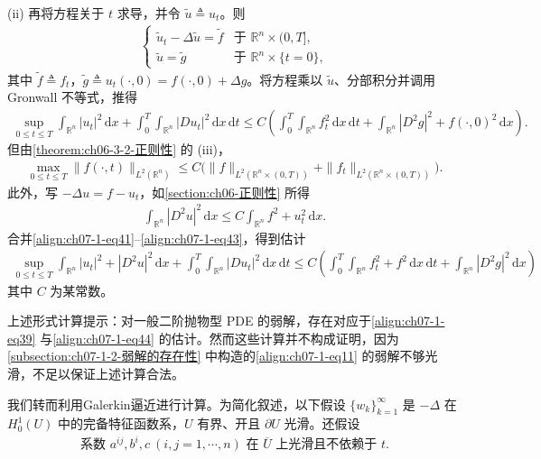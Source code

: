 \documentclass[../../main.tex]{subfiles}
\begin{document}
(ii) 再将方程关于 $t$ 求导，并令 $\widetilde{u}\triangleq u_t$。则
\begin{align}
\begin{cases}
\widetilde{u}_t-\Delta\widetilde{u}=\widetilde{f} & \text{于 } \mathbb{R}^n\times(0,T],\\
\widetilde{u}=\widetilde{g} & \text{于 } \mathbb{R}^n\times\{t=0\},
\end{cases}\label{align:ch07-1-eq40}
\end{align}
其中 $\widetilde{f}\triangleq f_t$，$\widetilde{g}\triangleq u_t(\cdot,0)=f(\cdot,0)+\Delta g$。将方程乘以 $\widetilde{u}$、分部积分并调用 Gronwall 不等式，推得
\begin{align}
\sup_{0\leqslant t\leqslant T}\int_{\mathbb{R}^n}|u_t|^2\,\mathrm{d}x + \int_0^T\int_{\mathbb{R}^n}|Du_t|^2\,\mathrm{d}x\,\mathrm{d}t
\leqslant C\left(\int_0^T\int_{\mathbb{R}^n} f_t^2\,\mathrm{d}x\,\mathrm{d}t + \int_{\mathbb{R}^n}|D^2g|^2+f(\cdot,0)^2\,\mathrm{d}x\right).\label{align:ch07-1-eq41}
\end{align}
但由\cref{theorem:ch06-3-2-正则性} 的 (iii)，
\begin{align}
\max_{0\leqslant t\leqslant T}\|f(\cdot,t)\|_{L^2(\mathbb{R}^n)} \leqslant C\bigl(\|f\|_{L^2(\mathbb{R}^n\times(0,T))}+\|f_t\|_{L^2(\mathbb{R}^n\times(0,T))}\bigr).\label{align:ch07-1-eq42}
\end{align}
此外，写 $-\Delta u=f-u_t$，如\cref{section:ch06-正则性} 所得
\begin{align}
\int_{\mathbb{R}^n}|D^2u|^2\,\mathrm{d}x \leqslant C\int_{\mathbb{R}^n} f^2+u_t^2\,\mathrm{d}x.\label{align:ch07-1-eq43}
\end{align}
合并\eqref{align:ch07-1-eq41}--\eqref{align:ch07-1-eq43}，得到估计
\begin{align}
\sup_{0\leqslant t\leqslant T}\int_{\mathbb{R}^n}|u_t|^2+|D^2u|^2\,\mathrm{d}x + \int_0^T\int_{\mathbb{R}^n}|Du_t|^2\,\mathrm{d}x\,\mathrm{d}t
\leqslant C\left(\int_0^T\int_{\mathbb{R}^n} f_t^2+f^2\,\mathrm{d}x\,\mathrm{d}t + \int_{\mathbb{R}^n}|D^2g|^2\,\mathrm{d}x\right)\label{align:ch07-1-eq44}
\end{align}
其中 $C$ 为某常数。

上述形式计算提示：对一般二阶抛物型 PDE 的弱解，存在对应于\eqref{align:ch07-1-eq39} 与\eqref{align:ch07-1-eq44} 的估计。然而这些计算并不构成证明，因为\cref{subsection:ch07-1-2-弱解的存在性} 中构造的\eqref{align:ch07-1-eq11} 的弱解不够光滑，不足以保证上述计算合法。

我们转而利用Galerkin逼近进行计算。为简化叙述，以下假设 $\{w_k\}_{k=1}^\infty$ 是 $-\Delta$ 在 $H^1_0(U)$ 中的完备特征函数系，$U$ 有界、开且 $\partial U$ 光滑。还假设
\begin{align}
\text{系数 } a^{ij},b^i,c\ (i,j=1,\cdots,n) \text{ 在 } \overline{U} \text{ 上光滑且不依赖于 } t.\label{align:ch07-1-eq45}
\end{align}
\end{document}
